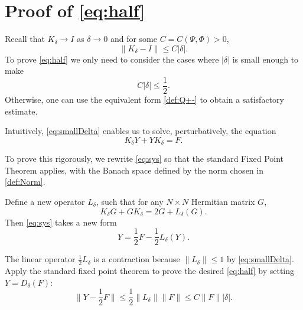 \documentclass{article}
\numberwithin{equation}{section}
\begin{document}
\section{Proof of \eqref{eq:half}}\label{sec:half}
Recall that $K_\delta \to I$ as $\delta \to 0$ and for some $C=C(\Psi,\Phi)>0$, $$\| K_\delta - I \| \leq C |\delta|.$$
To prove \eqref{eq:half} we only need to consider the cases where $|\delta|$ is small enough to make 
\begin{equation}\label{eq:smallDelta}
C |\delta|\leq \frac{1}{2}.
\end{equation} Otherwise, one can use the equivalent form \eqref{def:Q+-} to obtain a satisfactory estimate.

Intuitively, \eqref{eq:smallDelta} enables us to solve, perturbatively, the equation
\begin{equation}\label{eq:sys}
    K_\delta Y + Y K_\delta = F.
\end{equation}

To prove this rigorously, we rewrite \eqref{eq:sys} so that the standard Fixed Point Theorem applies, with the Banach space defined by the norm chosen in \eqref{def:Norm}. 

Define a new operator $L_{\delta}$, such that for any $N\times N$ Hermitian matrix $G$, $$K_\delta G+GK_{\delta} = 2G + L_\delta(G).$$ Then
\eqref{eq:sys} takes a new form
\[
Y = \frac{1}{2} F - \frac{1}{2}L_\delta(Y).
\]

The linear operator $\frac{1}{2} L_{\delta}$ is a contraction because $\| L_\delta \| \leq 1$ by \eqref{eq:smallDelta}. Apply the standard fixed point theorem to prove the desired \eqref{eq:half} by setting $Y=D_{\delta}(F)$:
\[
\| Y - \frac{1}{2} F \| \leq \frac{1}{2}\| L_\delta \| \| F \|\leq C \|F\| |\delta|.
\]
















%
%
\end{document}
